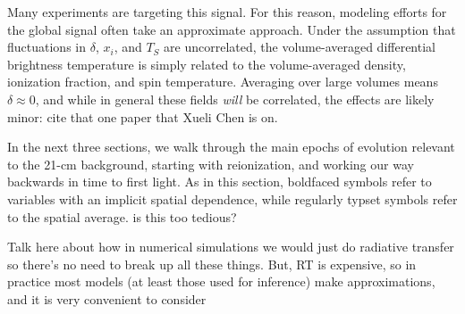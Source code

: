 Many experiments are targeting this signal. For this reason, modeling efforts for the global signal often take an approximate approach. Under the assumption that fluctuations in $\delta$, $x_i$, and $T_S$ are uncorrelated, the volume-averaged differential brightness temperature is simply related to the volume-averaged density, ionization fraction, and spin temperature. Averaging over large volumes means $\delta \approx 0$, and while in general these fields \textit{will} be correlated, {\color{red} the effects are likely minor: cite that one paper that Xueli Chen is on.}


In the next three sections, we walk through the main epochs of evolution relevant to the 21-cm background, starting with reionization, and working our way backwards in time to first light. As in this section, boldfaced symbols refer to variables with an implicit spatial dependence, while regularly typset symbols refer to the spatial average. {\color{red} is this too tedious?}

Talk here about how in numerical simulations we would just do radiative transfer so there's no need to break up all these things. But, RT is expensive, so in practice most models (at least those used for inference) make approximations, and it is very convenient to consider

